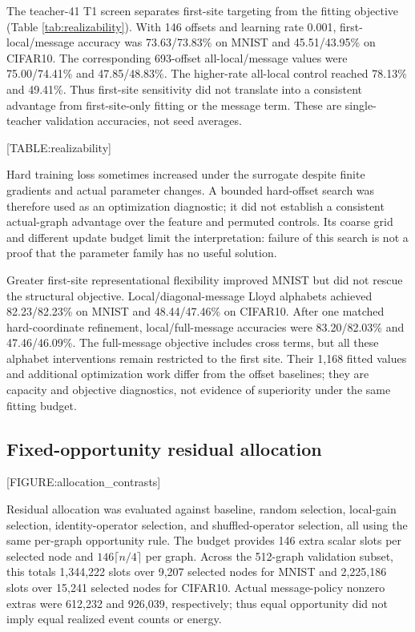 \documentclass{article}
\begin{document}
\label{sec:calibration_objectives_and_realizability}

The teacher-41 T1 screen separates first-site targeting from the fitting objective (Table \ref{tab:realizability}). With 146 offsets and learning rate 0.001, first-local/message accuracy was 73.63/73.83\% on MNIST and 45.51/43.95\% on CIFAR10. The corresponding 693-offset all-local/message values were 75.00/74.41\% and 47.85/48.83\%. The higher-rate all-local control reached 78.13\% and 49.41\%. Thus first-site sensitivity did not translate into a consistent advantage from first-site-only fitting or the message term. These are single-teacher validation accuracies, not seed averages.

[TABLE:realizability]

Hard training loss sometimes increased under the surrogate despite finite gradients and actual parameter changes. A bounded hard-offset search was therefore used as an optimization diagnostic; it did not establish a consistent actual-graph advantage over the feature and permuted controls. Its coarse grid and different update budget limit the interpretation: failure of this search is not a proof that the parameter family has no useful solution.

Greater first-site representational flexibility improved MNIST but did not rescue the structural objective. Local/diagonal-message Lloyd alphabets achieved 82.23/82.23\% on MNIST and 48.44/47.46\% on CIFAR10. After one matched hard-coordinate refinement, local/full-message accuracies were 83.20/82.03\% and 47.46/46.09\%. The full-message objective includes cross terms, but all these alphabet interventions remain restricted to the first site. Their 1,168 fitted values and additional optimization work differ from the offset baselines; they are capacity and objective diagnostics, not evidence of superiority under the same fitting budget.

\subsection{Fixed-opportunity residual allocation}

\label{sec:fixed_opportunity_residual_allocation}

[FIGURE:allocation\_contrasts]

Residual allocation was evaluated against baseline, random selection, local-gain selection, identity-operator selection, and shuffled-operator selection, all using the same per-graph opportunity rule. The budget provides 146 extra scalar slots per selected node and $146\lceil n/4\rceil$ per graph. Across the 512-graph validation subset, this totals 1,344,222 slots over 9,207 selected nodes for MNIST and 2,225,186 slots over 15,241 selected nodes for CIFAR10. Actual message-policy nonzero extras were 612,232 and 926,039, respectively; thus equal opportunity did not imply equal realized event counts or energy.
\end{document}
